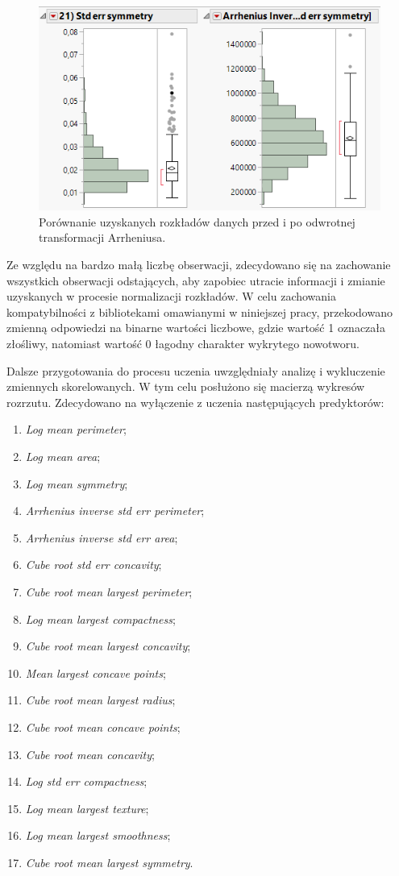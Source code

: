 	\begin{figure}[!ht]
		\centering
		\includegraphics[width=0.7\linewidth]{Rysunki/Rozdzial3/arrhenius}
		\caption{Porównanie uzyskanych rozkładów danych przed i po odwrotnej transformacji Arrheniusa.}
		\label{fig:arrhenius}
	\end{figure}
	
	Ze względu na bardzo małą liczbę obserwacji, zdecydowano się na zachowanie wszystkich obserwacji odstających, aby zapobiec utracie informacji i zmianie uzyskanych w procesie normalizacji rozkładów. W celu zachowania kompatybilności z bibliotekami omawianymi w niniejszej pracy, przekodowano zmienną odpowiedzi na binarne wartości liczbowe, gdzie wartość 1 oznaczała złośliwy, natomiast wartość 0 łagodny charakter wykrytego nowotworu.
	
	Dalsze przygotowania do procesu uczenia uwzględniały analizę i wykluczenie zmiennych skorelowanych. W tym celu posłużono się macierzą wykresów rozrzutu. Zdecydowano na wyłączenie z uczenia następujących predyktorów:
	
	\begin{enumerate}
		\item \textit{Log mean perimeter};
		\item \textit{Log mean area};
		\item \textit{Log mean symmetry};
		\item \textit{Arrhenius inverse std err perimeter};
		\item \textit{Arrhenius inverse std err area};
		\item \textit{Cube root std err concavity};
		\item \textit{Cube root mean largest perimeter};
		\item \textit{Log mean largest compactness};
		\item \textit{Cube root mean largest concavity};
		\item \textit{Mean largest concave points};
		\item \textit{Cube root mean largest radius};
		\item \textit{Cube root mean concave points};
		\item \textit{Cube root mean concavity};
		\item \textit{Log std err compactness};
		\item \textit{Log mean largest texture};
		\item \textit{Log mean largest smoothness};
		\item \textit{Cube root mean largest symmetry}.
	\end{enumerate}

